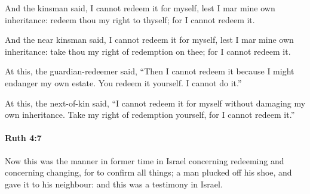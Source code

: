 			And the kinsman said, I cannot redeem it for myself, lest I mar mine own inheritance: redeem thou my right to thyself; for I cannot redeem it.

			\begin{versebox}
					\item[BHS] 
					\item[LXX] 
					\item[ASV] And the near kinsman said, I cannot redeem it for myself, lest I mar mine own inheritance: take thou my right of redemption on thee; for I cannot redeem it.
					\item[NIV] At this, the guardian-redeemer said, “Then I cannot redeem it because I might endanger my own estate. You redeem it yourself. I cannot do it.”
					\item[NRSV] At this, the next-of-kin said, “I cannot redeem it for myself without damaging my own inheritance. Take my right of redemption yourself, for I cannot redeem it.”
			\end{versebox}

		\paragraph{Ruth 4:7} %
			\label{RUTH-4-7}

			Now this was the manner in former time in Israel concerning redeeming and concerning changing, for to confirm all things; a man plucked off his shoe, and gave it to his neighbour: and this was a testimony in Israel.


